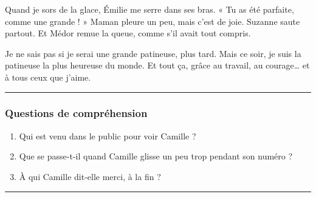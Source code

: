 \documentclass[
  french,
  french,
  14pt,
  a4paper]{extarticle}
\providecommand{\tightlist}{%
  \setlength{\itemsep}{0pt}\setlength{\parskip}{0pt}}
\begin{document}
{Quand je sors de la glace, Émilie me serre dans ses bras. « Tu as été
parfaite, comme une grande ! » Maman pleure un peu, mais c'est de joie.
Suzanne saute partout. Et Médor remue la queue, comme s'il avait tout
compris.

Je ne sais pas si je serai une grande patineuse, plus tard. Mais ce
soir, je suis la patineuse la plus heureuse du monde. Et tout ça, grâce
au travail, au courage\ldots{} et à tous ceux que j'aime.

\begin{center}\rule{0.5\linewidth}{0.5pt}\end{center}

\subsubsection{Questions de
compréhension}\label{questions-de-compruxe9hension-14}

\begin{enumerate}
\def\labelenumi{\arabic{enumi}.}
\tightlist
\item
  Qui est venu dans le public pour voir Camille ?
\item
  Que se passe-t-il quand Camille glisse un peu trop pendant son numéro
  ?
\item
  À qui Camille dit-elle merci, à la fin ?
\end{enumerate}

\begin{center}\rule{0.5\linewidth}{0.5pt}\end{center}

}%
\newpage
\end{document}

